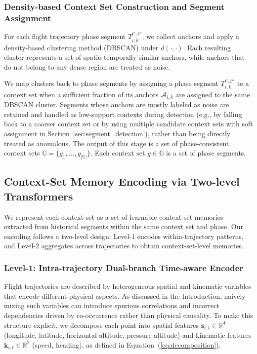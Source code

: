\documentclass[iicol,pdflatex,sn-basic,Numbered]{sn-jnl}%
\theoremstyle{thmstyleone}%
\theoremstyle{thmstyletwo}%
\theoremstyle{thmstylethree}%
\begin{document}
\subsubsection{Density-based Context Set Construction and Segment Assignment}

For each flight trajectory phase segment $T^{t',t''}_{i,k}$, we collect anchors and apply a density-based clustering method (DBSCAN) under $d(\cdot,\cdot)$.
Each resulting cluster represents a set of spatio-temporally similar anchors, while anchors that do not belong to any dense region are treated as noise.

We map clusters back to phase segments by assigning a phase segment $T^{t',t''}_{i,k}$ to a context set when a sufficient fraction of its anchors $\mathcal{A}_{i,k}$ are assigned to the same DBSCAN cluster.
Segments whose anchors are mostly labeled as noise are retained and handled as low-support contexts during detection (e.g., by falling back to a coarser context set or by using multiple candidate context sets with soft assignment in Section~\ref{sec:segment_detection}), rather than being directly treated as anomalous. The output of this stage is a set of phase-consistent context sets $\mathbb{G}=\{g_1,\ldots,g_{|\mathbb{G}|}\}$.
Each context set $g\in\mathbb{G}$ is a set of phase segments.

\subsection{Context-Set Memory Encoding via Two-level Transformers}
\label{sec:group_memory_encoding}

We represent each context set as a set of learnable context-set memories extracted from historical segments within the same context set and phase.
Our encoding follows a two-level design: Level-1 encodes within-trajectory patterns, and Level-2 aggregates across trajectories to obtain context-set-level memories.

\subsubsection{Level-1: Intra-trajectory Dual-branch Time-aware Encoder}

Flight trajectories are described by heterogeneous spatial and kinematic variables that encode different physical aspects. As discussed in the Introduction, naively mixing such variables can introduce spurious correlations and incorrect dependencies driven by co-occurrence rather than physical causality.
To make this structure explicit, we decompose each point into spatial features $\mathbf{s}_{i,t} \in \mathbb{R}^4$ (longitude, latitude, horizontal altitude, pressure altitude) and kinematic features $\mathbf{k}_{i,t} \in \mathbb{R}^2$ (speed, heading), as defined in Equation~(\ref{eq:decomposition}).
\end{document}
